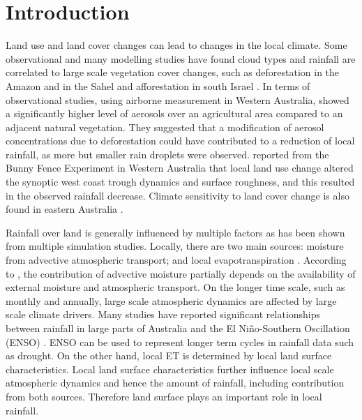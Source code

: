 \documentclass[onecolumn,referee]{svjour3}
\begin{document}

\section{Introduction}

Land use and land cover changes can lead to changes in the local climate. Some observational and many modelling studies have found cloud types and rainfall are correlated to large scale vegetation cover changes, such as deforestation in the Amazon and in the Sahel \citep{Chagnon2005,Pinto2009, Wang2009, Mei2010, kucharski_further_2013,pitman_scale_2016} and afforestation in south Israel \citep{Otterman1990, Ben-Gai1998}. In terms of observational studies, using airborne measurement in Western Australia, \citet{Junkermann2009} showed a significantly higher level of aerosols over an agricultural area compared to an adjacent natural vegetation. They suggested that a modification of aerosol concentrations due to deforestation could have contributed to a reduction of local rainfall, as more but smaller rain droplets were observed. \citet{Nair2011} reported from the Bunny Fence Experiment in Western Australia that local land use change altered the synoptic west coast trough dynamics and surface roughness, and this resulted in the observed rainfall decrease. Climate sensitivity to land cover change is also found in eastern Australia \citep{McAlpine2007}. 

Rainfall over land is generally influenced by multiple factors as has been shown from multiple simulation studies. Locally, there are two main sources: moisture from advective atmospheric transport; and local evapotranspiration \citep{Eltahir1996,Bosilovich2006,Dirmeyer2009,Gimeno2010}. According to \citet{Trenberth1999}, the contribution of advective moisture partially depends on the availability of external moisture and atmospheric transport. On the longer time scale, such as monthly and annually, large scale atmospheric dynamics are affected by large scale climate drivers. Many studies have reported significant relationships between rainfall in large parts of Australia and the El Ni\~{n}o-Southern Oscillation (ENSO) \citep{Verdon2004,Risbey2009,Speer2011}. ENSO can be used to represent longer term cycles in rainfall data such as drought. On the other hand, local ET is determined by local land surface characteristics. Local land surface characteristics further influence local scale atmospheric dynamics and hence the amount of rainfall, including contribution from both sources. Therefore land surface plays an important role in local rainfall. 
\end{document}
